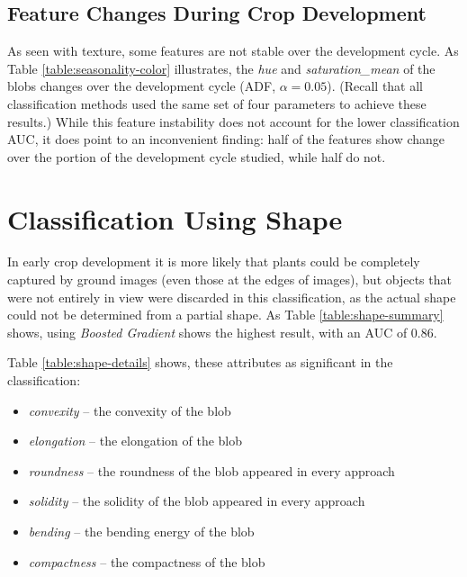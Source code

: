 \documentclass[letterpaper, notitlepage]{report}
\begin{document}
\subsection{Feature Changes During Crop Development}
As seen with texture, some features are not stable over the development cycle. As Table \ref{table:seasonality-color} illustrates, the \textit{hue} and \textit{saturation\_mean} of the blobs changes over the development cycle (ADF, $\alpha = 0.05$). (Recall that all classification methods used the same set of four parameters to achieve these results.) While this feature instability does not account for the lower classification AUC, it does point to an inconvenient finding: half of the features show change over the portion of the development cycle studied, while half do not.

{
\renewcommand{\arraystretch}{1.2}

}


\section{Classification Using Shape}
In early crop development it is more likely that plants could be completely captured by ground images (even those at the edges of images), but  objects that were not entirely in view were discarded in this classification, as the actual shape could not be determined from a partial shape.
As Table \ref{table:shape-summary} shows, using \textit{Boosted Gradient} shows the highest result, with an AUC of 0.86.

{

}

 Table \ref{table:shape-details} shows, these attributes as significant in the classification:
\begin{itemize}
	\item{\textit{convexity} -- the convexity of the blob}
	\item{\textit{elongation} -- the elongation of the blob}
	\item{\textit{roundness} -- the roundness of the blob appeared in every approach}
	\item{\textit{solidity} -- the solidity of the blob appeared in every approach}
	\item{\textit{bending} -- the bending energy of the blob}
	\item{\textit{compactness} -- the compactness of the blob}
	


\end{itemize}
 
\end{document}
